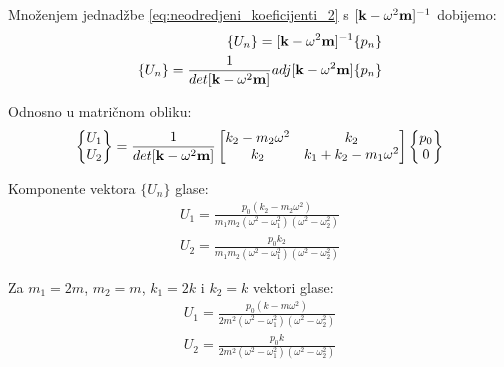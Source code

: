 %

Množenjem jednadžbe \eqref{eq:neodredjeni_koeficijenti_2} s $[\mathbf{k}-\omega^2\mathbf{m}]^{-1}$
dobijemo:
\begin{equation}
    \begin{split}
        \{U_n\}=[\mathbf{k}-\omega^2\mathbf{m}]^{-1}\{p_n\} \notag\\
        \{U_n\}=\frac{1}{det[\mathbf{k}-\omega^2\mathbf{m}]}adj[\mathbf{k}-\omega^2\mathbf{m}]\{p_n\}\label{eqneodredjeni_koeficijenti_3}
    \end{split}
\end{equation}

Odnosno u matričnom obliku:
\begin{equation}
    \begin{Bmatrix}
        U_1\\
        U_2
    \end{Bmatrix}
    =
    \frac{1}{det[\mathbf{k}-\omega^2\mathbf{m}]}
        \begin{bmatrix}
            k_2-m_2\omega^2 & k_2\\
            k_2 & k_1+k_2-m_1\omega^2
        \end{bmatrix}
        \begin{Bmatrix}
            p_0\\
            0
        \end{Bmatrix}
\end{equation}

Komponente vektora $\{U_n\}$ glase:
\begin{align}
    U_1=\frac{p_0(k_2-m_2\omega^2)}{m_1m_2(\omega^2-\omega_1^2)(\omega^2-\omega_2^2)} \label{eq:vtor_1_opce}\\
    U_2=\frac{p_0k_2}{m_1m_2(\omega^2-\omega_1^2)(\omega^2-\omega_2^2)}\label{eq:vtor_2_opce}
\end{align}

Za $m_1=2m$, $m_2=m$, $k_1=2k$ i $k_2=k$ vektori glase:
\begin{align}
    U_1=\frac{p_0(k-m\omega^2)}{2m^2(\omega^2-\omega_1^2)(\omega^2-\omega_2^2)}\label{eq:vtor_1}\\
    U_2=\frac{p_0k}{2m^2(\omega^2-\omega_1^2)(\omega^2-\omega_2^2)}\label{eq:vtor_2}
\end{align}

